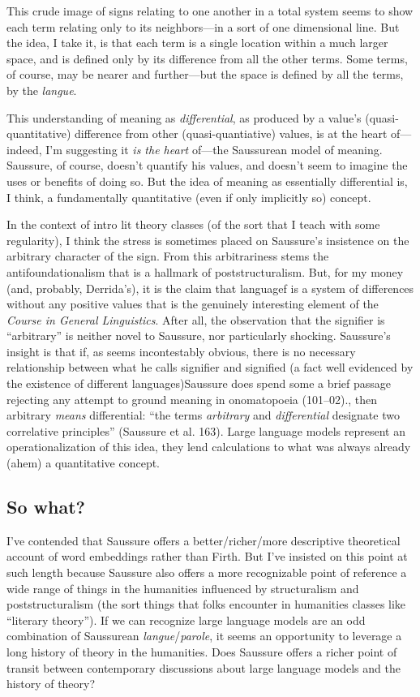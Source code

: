 \documentclass[
  12pt,
]{article}
\begin{document}
This crude image of signs relating to one another in a total system
seems to show each term relating only to its neighbors---in a sort of
one dimensional line. But the idea, I take it, is that each term is a
single location within a much larger space, and is defined only by its
difference from all the other terms. Some terms, of course, may be
nearer and further---but the space is defined by all the terms, by the
\emph{langue}.

This understanding of meaning as \emph{differential}, as produced by a
value's (quasi-quantitative) difference from other (quasi-quantiative)
values, is at the heart of---indeed, I'm suggesting it \emph{is the
heart} of---the Saussurean model of meaning. Saussure, of course,
doesn't quantify his values, and doesn't seem to imagine the uses or
benefits of doing so. But the idea of meaning as essentially
differential is, I think, a fundamentally quantitative (even if only
implicitly so) concept.

In the context of intro lit theory classes (of the sort that I teach
with some regularity), I think the stress is sometimes placed on
Saussure's insistence on the arbitrary character of the sign. From this
arbitrariness stems the antifoundationalism that is a hallmark of
poststructuralism. But, for my money (and, probably, Derrida's), it is
the claim that languagef is a system of differences without any positive
values that is the genuinely interesting element of the \emph{Course in
General Linguistics}. After all, the observation that the signifier is
``arbitrary'' is neither novel to Saussure, nor particularly shocking.
Saussure's insight is that if, as seems incontestably obvious, there is
no necessary relationship between what he calls signifier and signified
(a fact well evidenced by the existence of different languages){Saussure
does spend some a brief passage rejecting any attempt to ground meaning
in onomatopoeia (101--02).}, then arbitrary \emph{means} differential:
``the terms \emph{arbitrary} and \emph{differential} designate two
correlative principles'' (Saussure et al. 163). Large language models
represent an operationalization of this idea, they lend calculations to
what was always already (ahem) a quantitative concept.

\hypertarget{so-what}{%
\subsection{So what?}\label{so-what}}

I've contended that Saussure offers a better/richer/more descriptive
theoretical account of word embeddings rather than Firth. But I've
insisted on this point at such length because Saussure also offers a
more recognizable point of reference a wide range of things in the
humanities influenced by structuralism and poststructuralism (the sort
things that folks encounter in humanities classes like ``literary
theory''). If we can recognize large language models are an odd
combination of Saussurean \emph{langue}/\emph{parole}, it seems an
opportunity to leverage a long history of theory in the humanities. Does
Saussure offers a richer point of transit between contemporary
discussions about large language models and the history of theory?
\end{document}
